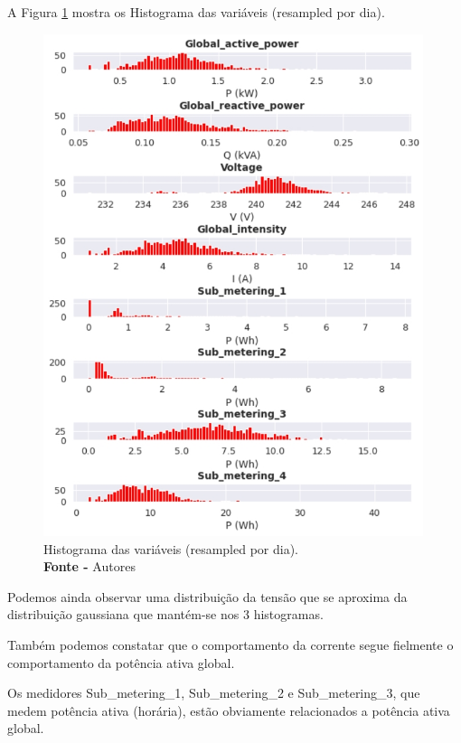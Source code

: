 A Figura \ref{fig: Histograma das variáveis (resampled por dia)} mostra os Histograma das variáveis (resampled por dia).
\begin{figure}[H]
    \centering
    \includegraphics[width=0.99\textwidth]{Figuras/4. Resultados e Discussões/Exer4/Histograma das variáveis (resampled por dia).jpg}
    \caption{Histograma das variáveis (resampled por dia).\\ \textbf{Fonte -} Autores}
    \label{fig: Histograma das variáveis (resampled por dia)}
\end{figure}

Podemos ainda observar uma distribuição da tensão que se aproxima da distribuição gaussiana que mantém-se nos $3$ histogramas.

Também podemos constatar que o comportamento da corrente segue fielmente o comportamento da potência ativa global.

Os medidores Sub\_metering\_1, Sub\_metering\_2 e Sub\_metering\_3, que medem potência ativa (horária), estão obviamente relacionados a potência ativa global.

